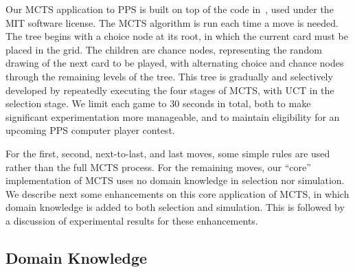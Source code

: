\documentclass[letterpaper]{article}
\begin{document}

Our MCTS application to PPS is built on top of the code in~\cite{hughart2012uct}, used under the MIT software license. The MCTS algorithm is run each time a move is needed. The tree begins with a choice node at its root, in which the current card must be placed in the grid. The children are chance nodes, representing the random drawing of the next card to be played, with alternating choice and chance nodes through the remaining levels of the tree. This tree is gradually and selectively developed by repeatedly executing the four stages of MCTS, with UCT in the selection stage. We limit each game to 30 seconds in total, both to make significant experimentation more manageable, and to maintain eligibility for an upcoming PPS computer player contest. 

For the first, second, next-to-last, and last moves, some simple rules are used rather than the full MCTS process. For the remaining moves, our ``core'' implementation of MCTS uses no domain knowledge in selection nor simulation. We describe next some enhancements on this core application of MCTS, in which domain knowledge is added to both selection and simulation. This is followed by a discussion of experimental results for these enhancements.

\subsection{Domain Knowledge}
\end{document}

